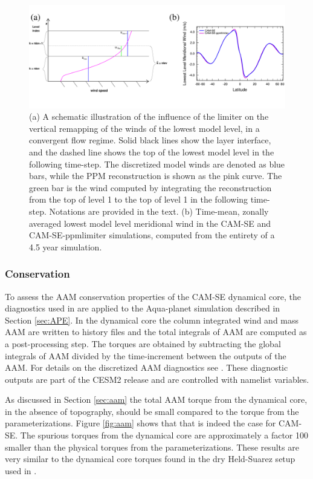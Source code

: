 \documentclass{agujournal}
\begin{document}
{\begin{figure}[h]
\centering
\includegraphics[width=30pc]{figs/schematic.pdf}
\caption{(a) A schematic illustration of the influence of the limiter on the vertical remapping of the winds of the lowest model level, in a convergent flow regime. Solid black lines show the layer interface, and the dashed line shows the top of the lowest model level in the following time-step. The discretized model winds are denoted as blue bars, while the PPM reconstruction is shown as the pink curve. The green bar is the wind computed by integrating the reconstruction from the top of level 1 to the top of level 1 in the following time-step. Notations are provided in the text. (b) Time-mean, zonally averaged lowest model level meridional wind in the CAM-SE and CAM-SE-ppmlimiter simulations, computed from the entirety of a 4.5 year simulation.}
\label{fig:schematic}
\end{figure}

\subsubsection{Conservation}
To assess the AAM conservation properties of the CAM-SE dynamical core, the diagnostics used in \cite{LBDL2014JAMES} are applied to the Aqua-planet simulation described in Section \ref{sec:APE}. In the dynamical core the column integrated wind and mass AAM are written to history files and the total integrals of AAM are computed as a post-processing step. The torques are obtained by subtracting the global integrals of AAM divided by the time-increment between the outputs of the AAM. For details on the discretized AAM diagnostics see \cite{LBDL2014JAMES}. These diagnostic outputs are part of the CESM2 release and are controlled with namelist variables.

As discussed in Section \ref{sec:aam} the total AAM torque from the dynamical core, in the absence of topography, should be small compared to the torque from the parameterizations. Figure \ref{fig:aam} shows that that is indeed the case for CAM-SE. The spurious torques from the dynamical core are approximately a factor 100 smaller than the physical torques from the parameterizations. These results are very similar to the dynamical core torques found in the dry Held-Suarez setup used in \citet{LBDL2014JAMES}.

}
\end{document}
